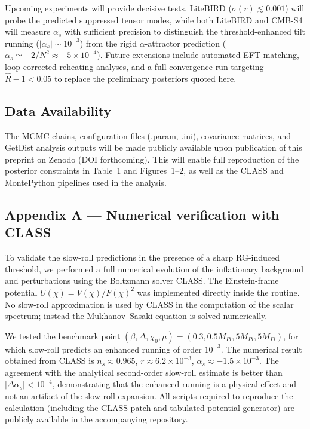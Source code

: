 \documentclass[
]{article}
\begin{document}
Upcoming experiments will provide decisive tests. LiteBIRD
(\(\sigma(r) \lesssim 0.001\)) will probe the predicted suppressed
tensor modes, while both LiteBIRD and CMB-S4 will measure
\(\alpha_{s}\) with sufficient precision to distinguish the
threshold-enhanced tilt running (\(|\alpha_{s}| \sim 10^{-3}\)) from
the rigid \(\alpha\)-attractor prediction
(\(\alpha_{s} \simeq -2/N^{2} \approx -5 \times 10^{-4}\)).
Future extensions include automated EFT matching, loop-corrected
reheating analyses, and a full convergence run targeting
\(\hat{R}-1 < 0.05\) to replace the preliminary posteriors quoted here.

\subsection{Data Availability}\label{data-availability}

The MCMC chains, configuration files (.param, .ini), covariance
matrices, and GetDist analysis outputs will be made publicly available
upon publication of this preprint on Zenodo (DOI forthcoming). This will
enable full reproduction of the posterior constraints in Table~1 and
Figures~1--2, as well as the CLASS and MontePython pipelines used in the
analysis.

\subsection{Appendix A --- Numerical verification with
CLASS}\label{appendix-a-numerical-verification-with-class}

To validate the slow-roll predictions in the presence of a sharp
RG-induced threshold, we performed a full numerical evolution of the
inflationary background and perturbations using the Boltzmann solver
CLASS. The Einstein-frame potential \(U(\chi) = V(\chi)/F(\chi)^{2}\)
was implemented directly inside the routine. No slow-roll approximation
is used by CLASS in the computation of the scalar spectrum; instead the
Mukhanov--Sasaki equation is solved numerically.

We tested the benchmark point
\((\beta, \Delta, \chi_{0}, \mu) = (0.3, 0.5 M_{Pl}, 5 M_{Pl}, 5 M_{Pl})\),
for which slow-roll predicts an enhanced running of order \(10^{- 3}\).
The numerical result obtained from CLASS is \(n_{s} \approx 0.965\),
\(r \approx 6.2 \times 10^{- 3}\),
\(\alpha_{s} \approx - 1.5 \times 10^{- 3}\). The agreement with the
analytical second-order slow-roll estimate is better than
\(|\Delta\alpha_{s}| < 10^{- 4}\), demonstrating that the enhanced
running is a physical effect and not an artifact of the slow-roll
expansion. All scripts required to reproduce the calculation (including
the CLASS patch and tabulated potential generator) are publicly
available in the accompanying repository.
\end{document}
